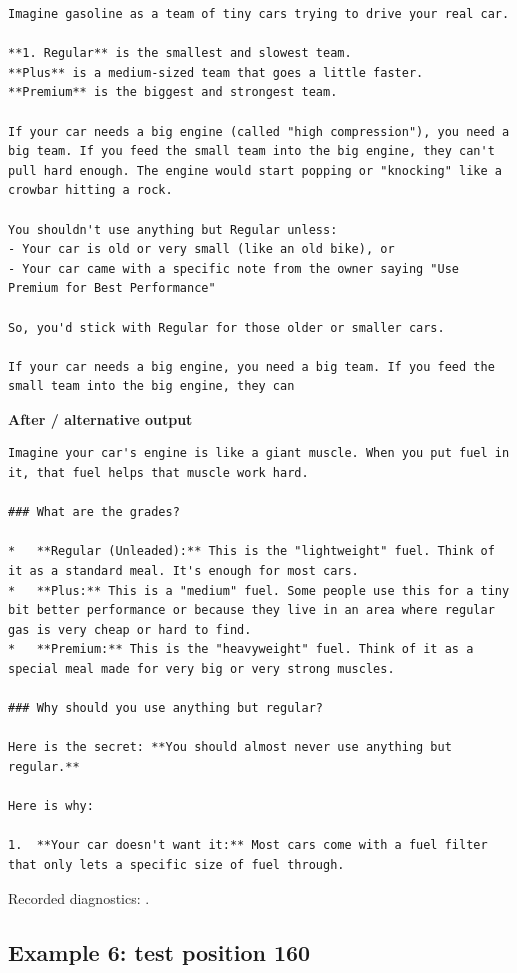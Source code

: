 \begin{Verbatim}
Imagine gasoline as a team of tiny cars trying to drive your real car.

**1. Regular** is the smallest and slowest team.
**Plus** is a medium-sized team that goes a little faster.
**Premium** is the biggest and strongest team.

If your car needs a big engine (called "high compression"), you need a big team. If you feed the small team into the big engine, they can't pull hard enough. The engine would start popping or "knocking" like a crowbar hitting a rock.

You shouldn't use anything but Regular unless:
- Your car is old or very small (like an old bike), or
- Your car came with a specific note from the owner saying "Use Premium for Best Performance"

So, you'd stick with Regular for those older or smaller cars.

If your car needs a big engine, you need a big team. If you feed the small team into the big engine, they can
\end{Verbatim}

\textbf{After / alternative output}

\begin{Verbatim}
Imagine your car's engine is like a giant muscle. When you put fuel in it, that fuel helps that muscle work hard.

### What are the grades?

*   **Regular (Unleaded):** This is the "lightweight" fuel. Think of it as a standard meal. It's enough for most cars.
*   **Plus:** This is a "medium" fuel. Some people use this for a tiny bit better performance or because they live in an area where regular gas is very cheap or hard to find.
*   **Premium:** This is the "heavyweight" fuel. Think of it as a special meal made for very big or very strong muscles.

### Why should you use anything but regular?

Here is the secret: **You should almost never use anything but regular.**

Here is why:

1.  **Your car doesn't want it:** Most cars come with a fuel filter that only lets a specific size of fuel through.
\end{Verbatim}

Recorded diagnostics:
\texttt{}.

\subsection{Example 6: test position
160}\label{record-docs-watermarking-qualitative-text-latent-direct-topk-md-example-6-test-position-160}

